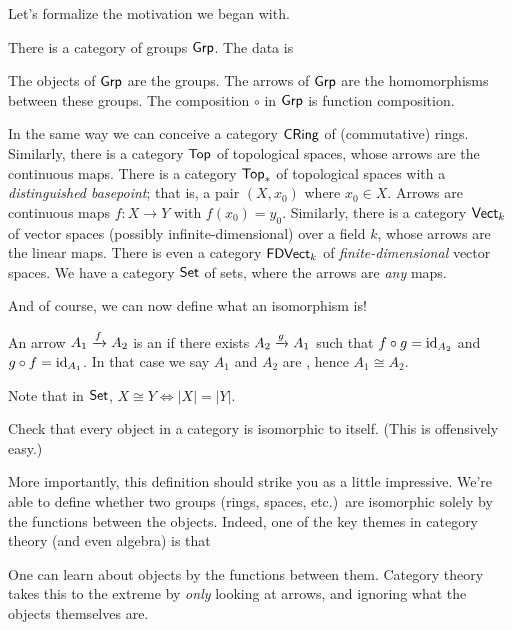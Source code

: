 Let's formalize the motivation we began with.
\begin{example}
	\listhack
	\label{ex:basic_categories}
	\begin{enumerate}[(a)]
		\ii There is a category of groups $\mathsf{Grp}$. The data is
		\begin{itemize}
			\ii The objects of $\mathsf{Grp}$ are the groups.
			\ii The arrows of $\mathsf{Grp}$ are the homomorphisms between these groups.
			\ii The composition $\circ$ in $\mathsf{Grp}$ is function composition.
		\end{itemize}
		\ii In the same way we can conceive a category $\mathsf{CRing}$ of (commutative) rings.
		\ii Similarly, there is a category $\mathsf{Top}$ of topological spaces,
		whose arrows are the continuous maps.
		\ii There is a category $\mathsf{Top}_\ast$ of topological spaces with a \emph{distinguished basepoint};
		that is, a pair $(X, x_0)$ where $x_0 \in X$.
		Arrows are continuous maps $f \colon X \to Y$ with $f(x_0) = y_0$.
		\ii Similarly, there is a category $\mathsf{Vect}_k$ of
		vector spaces (possibly infinite-dimensional) over a field $k$,
		whose arrows are the linear maps.
		There is even a category $\mathsf{FDVect}_k$ of
		\emph{finite-dimensional} vector spaces.
		\ii We have a category $\mathsf{Set}$ of sets,
		where the arrows are \emph{any} maps.
	\end{enumerate}
\end{example}
And of course, we can now define what an isomorphism is!
\begin{definition}
	An arrow $A_1 \xrightarrow{f} A_2$ is an 
	if there exists $A_2 \xrightarrow{g} A_1$ such that $f \circ g = \mathrm{id}_{A_2}$
	and $g \circ f = \mathrm{id}_{A_1}$.
	In that case we say $A_1$ and $A_2$ are , hence $A_1 \cong A_2$.
\end{definition}
\begin{remark}
	Note that in $\mathsf{Set}$, $X \cong Y
	\iff \left\lvert X \right\rvert = \left\lvert Y \right\rvert$.
\end{remark}
\begin{ques}
	Check that every object in a category is isomorphic to itself.
	(This is offensively easy.)
\end{ques}
More importantly, this definition should strike you as a little impressive.
We're able to define whether two groups (rings, spaces, etc.)\ are isomorphic
solely by the functions between the objects.
Indeed, one of the key themes in category theory (and even algebra) is that
\begin{moral}
	One can learn about objects by the functions between them.
	Category theory takes this to the extreme by \emph{only} looking at arrows,
	and ignoring what the objects themselves are.
\end{moral}

